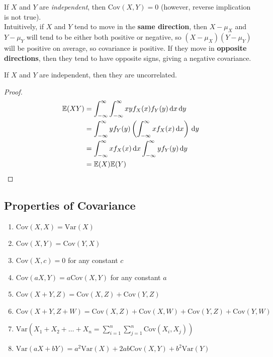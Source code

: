 \documentclass{article}
\begin{document}
\noindent If $X$ and $Y$ are \textit{independent}, then $\text{Cov}(X,Y) = 0$ (however, reverse implication is not true). \\

\noindent Intuitively, if $X$ and $Y$ tend to move in the \textbf{same direction}, then $X - \mu_X$ and $Y - \mu_Y$ will tend to be either both positive or negative, so $(X - \mu_X)(Y - \mu_Y)$ will be positive on average, so covariance is positive. If they move in \textbf{opposite directions}, then they tend to have opposite signs, giving a negative covariance. 

\begin{theorem}
    If $X$ and $Y$ are independent, then they are uncorrelated. \begin{proof}
        \begin{align*}
            \mathbb{E}(XY) &= \int_{-\infty}^{\infty} \int_{-\infty}^{\infty} xyf_X(x)f_Y(y) \, \mathrm{d}x \, \mathrm{d}y \\ 
            &= \int_{-\infty}^{\infty} yf_Y(y) \left( \int_{-\infty}^{\infty} xf_X(x) \, \mathrm{d}x\right) \, \mathrm{d}y \\ 
            &= \int_{-\infty}^{\infty} xf_X(x) \, \mathrm{d}x \int_{-\infty}^{\infty} yf_Y(y) \, \mathrm{d}y \\ 
            &= \mathbb{E}(X)\mathbb{E}(Y) \qedhere
        \end{align*}
    \end{proof}
\end{theorem}

\subsection{Properties of Covariance}

\begin{enumerate}
    \item $\text{Cov}(X,X) = \text{Var}(X)$
    \item $\text{Cov}(X,Y) = \text{Cov}(Y,X)$
    \item $\text{Cov}(X,c) = 0$ for any constant $c$
    \item $\text{Cov}(aX, Y) = a \text{Cov}(X,Y)$ for any constant $a$
    \item $\text{Cov}(X + Y, Z) = \text{Cov} (X,Z) + \text{Cov}(Y,Z)$
    \item $\text{Cov}(X+Y, Z+W) = \text{Cov}(X,Z) + \text{Cov}(X,W) + \text{Cov}(Y,Z) + \text{Cov}(Y,W)$
    \item $\text{Var}(X_{1} + X_{2} + \dots + X_n = \displaystyle\sum_{i=1}^{n} \displaystyle\sum_{j=1}^{n} \text{Cov}(X_i,X_j))$
    \item $\text{Var}(aX + bY) = a^{2}\text{Var}(X) + 2ab \text{Cov}(X,Y) + b^{2}\text{Var}(Y)$
\end{enumerate}
\end{document}
